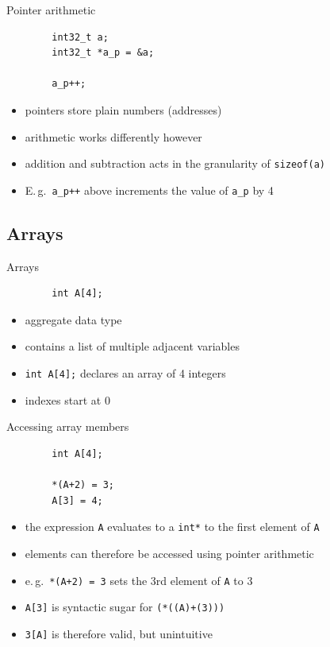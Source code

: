 \documentclass[english,compress]{beamer}
\begin{document}
\begin{frame}[fragile]{Pointer arithmetic}
	\begin{lstlisting}
		int32_t a;
		int32_t *a_p = &a;

		a_p++;
	\end{lstlisting}
	\begin{itemize}
		\item pointers store plain numbers (addresses)
		\item arithmetic works differently however
		\item addition and subtraction acts in the granularity
			of \lstinline|sizeof(a)|
		\item E.\,g.\ \lstinline|a_p++| above increments the value
			of \lstinline|a_p| by 4
	\end{itemize}
\end{frame}

\subsection{Arrays}
\begin{frame}[fragile]{Arrays}
	\begin{lstlisting}
		int A[4];
	\end{lstlisting}
	\begin{itemize}
		\item aggregate data type
		\item contains a list of multiple adjacent variables
		\item \lstinline|int A[4];| declares an array of 4 integers
		\item indexes start at 0
	\end{itemize}
\end{frame}

\begin{frame}[fragile]{Accessing array members}
	\begin{lstlisting}
		int A[4];

		*(A+2) = 3;
		A[3] = 4;
	\end{lstlisting}
	\begin{itemize}
		\item the expression \lstinline|A| evaluates to a \lstinline|int*| to the first element of \lstinline|A|
		\item elements can therefore be accessed using pointer arithmetic
		\item e.\,g.\ \lstinline|*(A+2) = 3| sets the 3rd element of \lstinline|A| to 3
		\item \lstinline|A[3]| is syntactic sugar for \lstinline|(*((A)+(3)))|
		\item \lstinline|3[A]| is therefore valid, but unintuitive
	\end{itemize}
\end{frame}
\end{document}
